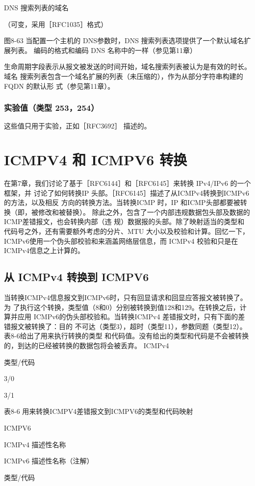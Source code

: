 DNS 搜索列表的域名

（可变，采用［RFC1035］格式）

图8-63 当配置一个主机的 DNS参数时，DNS 搜索列表选项提供了一个默认域名扩展列表。
编码的格式和编码 DNS 名称中的一样（参见第11章）

生命周期字段表示从报文被发送的时间开始，域名搜索列表被认为是有效的时长。域名
搜索列表包含一个域名扩展的列表（未压缩的），作为从部分字符串构建的FQDN 的默认形
式（参见第11章）。

\subsubsection{实验值（类型 253，254）}
这些值只用于实验，正如［RFC3692］ 描述的。

\section{ICMPV4 和 ICMPV6 转换}
在第7章，我们讨论了基于［RFC6144］和［RFC6145］来转换 IPv4/IPv6 的一个框架，并
讨论了如何转换IP 头部。［RFC6145］描述了从ICMPv4转换到ICMPv6 的方法，以及相反
方向的转换方法。当转换ICMP 时，IP 和ICMP头部都要被转换（即，被修改和被替换）。
除此之外，包含了一个内部违规数据包头部及数据的ICMP差错报文，也会转换内部（违
规）数据报的头部。除了映射适当的类型和代码号之外，还有需要额外考虑的分片、MTU
大小以及校验和计算。回忆一下，ICMPv6使用一个伪头部校验和来涵盖网络层信息，而
ICMPv4 校验和只是在ICMPv4信息之上计算的。

\subsection{从 ICMPv4 转换到 ICMPV6}
当转换ICMPv4信息报文到ICMPv6时，只有回显请求和回显应答报文被转换了。为
了执行这个转换，类型值（8和0）分别被转换到值128和129。在转换之后，计算并应用
ICMPv6的伪头部校验和。当转换ICMPv4 差错报文时，只有下面的差错报文被转换了：目的
不可达（类型3），超时（类型11），参数同题（类型12）。表8-6给出了用来执行转换的类型
和代码值。没有给出的类型和代码是不会被转换的，到达的已经被转换的数据包将会被丢弃。
ICMPv4

类型/代码

3/0

3/1

表8-6 用来转换ICMPV4差错报文到ICMPV6的类型和代码映射

ICMPV6

ICMPv4 描述性名称

ICMPv6 描述性名称（注解）

类型/代码

